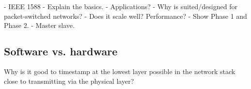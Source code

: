 - IEEE 1588
- Explain the basics. 
- Applications?
- Why is suited/designed for packet-switched networks?
- Does it scale well? Performance?
- Show Phase 1 and Phase 2.
- Master slave.

\subsection{Software vs. hardware}

Why is it good to timestamp at the lowest layer possible in the network stack close to transmitting via the physical layer?
